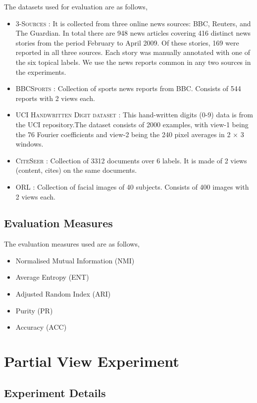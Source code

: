 \documentclass[a4paper]{article}
\begin{document}
	The datasets used for evaluation are as follows,
	\begin{itemize}
	\item \textsc{3-Sources} : It is collected from three online news sources: BBC, Reuters, and The Guardian. In total there are 948 news articles covering 416 distinct news stories from the period February to April 2009. Of these stories, 169 were reported in all three sources. Each story was manually annotated with one of the six topical labels. We use the news reports common in any two sources in the experiments.
	\item \textsc{BBCSports} : Collection of sports news reports from BBC. Consists of 544 reports with 2 views each.
	\item \textsc{UCI Handwritten Digit dataset} : This hand-written digits (0-9) data is from the UCI repository.The dataset consists of 2000 examples, with view-1 being the 76 Fourier coefficients and view-2 being the 240 pixel averages in 2 × 3 windows.	
	\item \textsc{CiteSeer} : Collection of 3312 documents over 6 labels. It is made of 2 views (content, cites) on the same documents.
	\item \textsc{ORL} : Collection of facial images of 40 subjects. Consists of 400 images with 2 views each.	
	\end{itemize}

	\subsection{Evaluation Measures}

	The evaluation measures used are as follows,
	\begin{itemize}
	\item {Normalised Mutual Information (NMI)}
	\item {Average Entropy (ENT)}
	\item {Adjusted Random Index (ARI)}
	\item {Purity (PR)}
	\item {Accuracy (ACC)}
	\end{itemize}
	
	\section{Partial View Experiment}	
	
	\subsection{Experiment Details}
	
\end{document}
